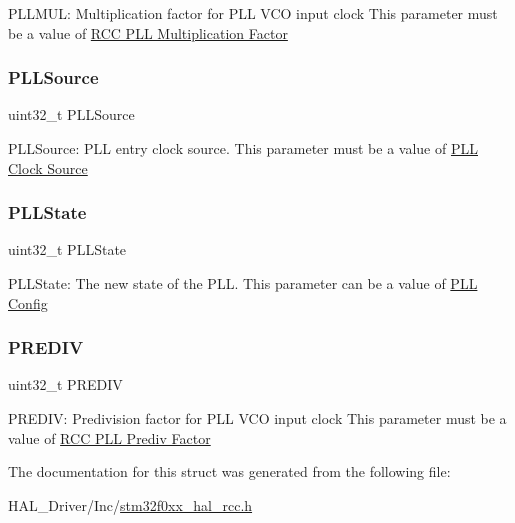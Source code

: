 P\+L\+L\+M\+UL\+: Multiplication factor for P\+LL V\+CO input clock This parameter must be a value of \hyperlink{group___r_c_c___p_l_l___multiplication___factor}{R\+CC P\+LL Multiplication Factor} \mbox{\label{struct_r_c_c___p_l_l_init_type_def_a418ecda4a355c6a161e4893a7bc1897f}} 
\subsubsection{\texorpdfstring{P\+L\+L\+Source}{PLLSource}}
{\footnotesize\ttfamily uint32\+\_\+t P\+L\+L\+Source}

P\+L\+L\+Source\+: P\+LL entry clock source. This parameter must be a value of \hyperlink{group___r_c_c___p_l_l___clock___source}{P\+LL Clock Source} \mbox{\label{struct_r_c_c___p_l_l_init_type_def_ab3bb33f461bb409576e1c899c962e0b0}} 
\subsubsection{\texorpdfstring{P\+L\+L\+State}{PLLState}}
{\footnotesize\ttfamily uint32\+\_\+t P\+L\+L\+State}

P\+L\+L\+State\+: The new state of the P\+LL. This parameter can be a value of \hyperlink{group___r_c_c___p_l_l___config}{P\+LL Config} \mbox{\label{struct_r_c_c___p_l_l_init_type_def_a0b568dda5046e1a2f02180f20f105aed}} 
\subsubsection{\texorpdfstring{P\+R\+E\+D\+IV}{PREDIV}}
{\footnotesize\ttfamily uint32\+\_\+t P\+R\+E\+D\+IV}

P\+R\+E\+D\+IV\+: Predivision factor for P\+LL V\+CO input clock This parameter must be a value of \hyperlink{group___r_c_c___p_l_l___prediv___factor}{R\+CC P\+LL Prediv Factor} 

The documentation for this struct was generated from the following file\+:\begin{DoxyCompactItemize}
\item 
H\+A\+L\+\_\+\+Driver/\+Inc/\hyperlink{stm32f0xx__hal__rcc_8h}{stm32f0xx\+\_\+hal\+\_\+rcc.\+h}\end{DoxyCompactItemize}
